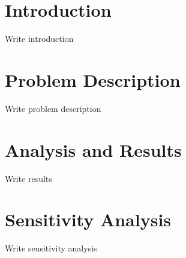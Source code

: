 \documentclass{article}
\begin{document}

\section{Introduction}

Write introduction

\section{Problem Description}

Write problem description

\section{Analysis and Results}

Write results

\section{Sensitivity Analysis}

Write sensitivity analysis
\end{document}
